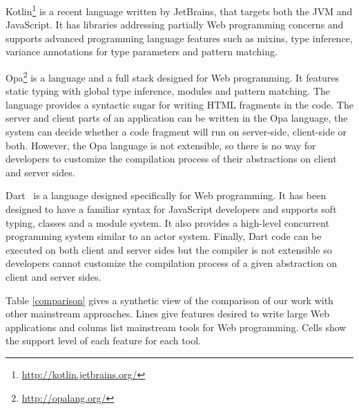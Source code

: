 \documentclass[american,english,runningheads]{llncs}
\begin{document}
Kotlin\footnote{\href{http://kotlin.jetbrains.org/}{http://kotlin.jetbrains.org/}} is a recent language written by
JetBrains, that targets both the JVM and JavaScript. It has libraries addressing partially Web programming concerns
and supports advanced programming language features such as mixins, type inference, variance annotations for type
parameters and pattern matching.

Opa\footnote{\href{http://opalang.org/}{http://opalang.org/}} is a language and a full stack designed for Web
programming. It features static typing with global type inference, modules and pattern matching. The language
provides a syntactic sugar for writing HTML fragments in the code. The server and client parts of an application can
be written in the Opa language, the system can decide whether a code fragment will run on server-side, client-side or
both. However, the Opa language is not extensible, so there is no way for developers to customize the compilation
process of their abstractions on client and server sides.

Dart~\cite{Griffith11_Dart} is a language designed specifically for Web programming. It has been designed to have a
familiar syntax for JavaScript developers and supports soft typing, classes and a module system. It also provides a
high-level concurrent programming system similar to an actor system. Finally, Dart code can be executed on both
client and server sides but the compiler is not extensible so developers cannot customize the compilation process of
a given abstraction on client and server sides.

Table \ref{comparison} gives a synthetic view of the comparison of our work with other mainstream approaches. Lines
give features desired to write large Web applications and colums list mainstream tools for Web programming. Cells
show the support level of each feature for each tool.
\end{document}
